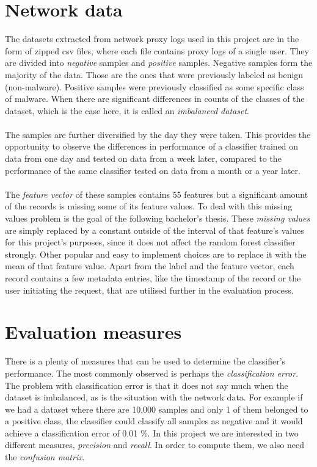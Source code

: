 \documentclass[11pt]{article}
\begin{document}
  \section{Network data}
    The datasets extracted from network proxy logs used in this project are in the form of zipped csv files, where each file contains proxy logs of a single user. They are divided into {\it negative} samples and {\it positive} samples. Negative samples form the majority of the data. Those are the ones that were previously labeled as benign (non-malware). Positive samples were previously classified as some specific class of malware. When there are significant differences in counts of the classes of the dataset, which is the case here, it is called an {\it imbalanced dataset}.
    \\~\\
    The samples are further diversified by the day they were taken. This provides the opportunity to observe the differences in performance of a classifier trained on data from one day and tested on data from a week later, compared to the performance of the same classifier tested on data from a month or a year later.
    \\~\\
    The {\it feature vector} of these samples contains 55 features but a significant amount of the records is missing some of its feature values. To deal with this missing values problem is the goal of the following bachelor's thesis. These {\it missing values} are simply replaced by a constant outside of the interval of that feature's values for this project's purposes, since it does not affect the random forest classifier strongly. Other popular and easy to implement choices are to replace it with the mean of that feature value. Apart from the label and the feature vector, each record contains a few metadata entries, like the timestamp of the record or the user initiating the request, that are utilised further in the evaluation process.
  \newpage
  \section{Evaluation measures}
    There is a plenty of measures that can be used to determine the classifier's performance. The most commonly observed is perhaps the {\it classification error}\cite{brabec}. The problem with classification error is that it does not say much when the dataset is imbalanced, as is the situation with the network data. For example if we had a dataset where there are 10,000 samples and only 1 of them belonged to a positive class, the classifier could classify all samples as negative and it would achieve a classification error of 0.01 \%. In this project we are interested in two different measures, {\it precision} and {\it recall}. In order to compute them, we also need the {\it confusion matrix}.
\end{document}

